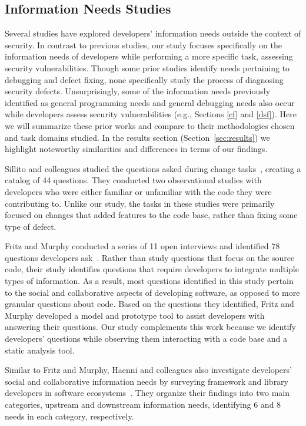 \documentclass[10pt,journal,compsoc]{IEEEtran}
\begin{document}
\subsection{Information Needs Studies}
\label{questions}
Several studies have explored developers' information needs outside the context of security.
In contrast to previous studies, our study focuses specifically on the information needs of developers while performing a more specific task, assessing security vulnerabilities.
Though some prior studies identify needs pertaining to debugging and defect fixing, none specifically study the process of diagnosing security defects.
Unsurprisingly, some of the information needs previously identified as general programming needs and general debugging needs also occur while developers assess security vulnerabilities (e.g., Sections \ref{cf} and \ref{dsf}).
Here we will summarize these prior works and compare to their methodologies chosen and task domains 
studied.
In the results section (Section~\ref{sec:results}) we highlight noteworthy similarities and differences in terms of our findings.

Sillito and colleagues studied the questions asked during change tasks~\cite{sillito2008asking}, creating a catalog of 44 questions.
They conducted two observational studies with developers who were either familiar or unfamiliar with the code they were contributing to.
Unlike our study, the tasks in these studies were primarily focused on changes that added features to the code base, rather than fixing some type of defect.

Fritz and Murphy conducted a series of 11 open interviews and identified 78 questions developers ask~\cite{fritz2010using}. 
Rather than study questions that focus on the source code, their study identifies questions that require developers to integrate multiple types of information.
As a result, most questions identified in this study pertain to the social and collaborative aspects of developing software, as opposed to more granular questions about code.
Based on the questions they identified, Fritz and Murphy developed a model and prototype tool to assist developers with answering their questions. 
Our study complements this work because we identify developers' questions while observing them interacting with a code base and a static analysis tool.

Similar to Fritz and Murphy, Haenni and colleagues also investigate developers' social and collaborative information needs by surveying framework and library developers in software ecosystems~\cite{haenni2013categorizing}.
They organize their findings into two main categories, upstream and downstream information needs, identifying 6 and 8 needs in each category, respectively.
\end{document}
